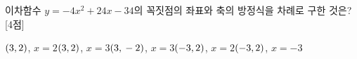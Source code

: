 이차함수 $y=-4x^2+24x-34$의 꼭짓점의 좌표와 축의 방정식을 차례로 구한 것은? \mbox{[4점]}
\begin{choicesii}{$(3{,}\mkern3mu 2)$, $x=2$}{$(3{,}\mkern3mu 2)$, $x=3$}{$(3{,}\mkern3mu -2)$, $x=3$}{$(-3{,}\mkern3mu 2)$, $x=2$}{$(-3{,}\mkern3mu 2)$, $x=-3$}\end{choicesii}
